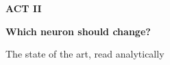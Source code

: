 \begin{frame}[t]
  \vspace{1.55cm}
  {\color{Shunt}\bfseries\scriptsize ACT II\par}
  \vspace{0.30cm}
  {\fontsize{20}{25}\selectfont\bfseries\color{Ink}Which neuron should change?\par}
  \vspace{0.28cm}
  {\small\color{Mute}The state of the art, read analytically\par}
  \vfill
  \hfill{}\par
  \vspace{0.12cm}
\end{frame}



